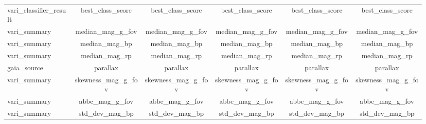 \documentclass[12pt,a4paper]{article}
\begin{document}
\begin{table}[h]
\begin{subtable}[h]{0.45\textwidth}
\begin{tabular}{lccccc}
\multicolumn{1}{l|}{vari\_classifier\_result } &         best\_class\_score                               &          best\_class\_score                 &          best\_class\_score                      &                                           best\_class\_score  &            best\_class\_score                   \\
\multicolumn{1}{l|}{vari\_summary}             &            median\_mag\_g\_fov                             &        median\_mag\_g\_fov                 &         median\_mag\_g\_fov                     &                    median\_mag\_g\_fov                       &         median\_mag\_g\_fov                    \\
\multicolumn{1}{l|}{vari\_summary}             &    median\_mag\_bp                                   &     median\_mag\_bp                       &         median\_mag\_bp                        &                                           median\_mag\_bp   &           median\_mag\_bp                     \\
\multicolumn{1}{l|}{vari\_summary }            &          median\_mag\_rp                           &          median\_mag\_rp              &         median\_mag\_rp                    &                                         median\_mag\_rp &          median\_mag\_rp                  \\
\multicolumn{1}{l|}{gaia\_source}              &     parallax                                 &    parallax                    &        parallax                     &            parallax                              &                           parallax \\
\multicolumn{1}{l|}{vari\_summary }            &        skewness\_mag\_g\_fov                               &     skewness\_mag\_g\_fov                     &         skewness\_mag\_g\_fov                      &                skewness\_mag\_g\_fov                            &          skewness\_mag\_g\_fov                    \\
\multicolumn{1}{l|}{vari\_summary}             &       abbe\_mag\_g\_fov                                &       abbe\_mag\_g\_fov                   &      abbe\_mag\_g\_fov                         &                                          abbe\_mag\_g\_fov  &           abbe\_mag\_g\_fov                   \\
\multicolumn{1}{l|}{vari\_summary }            &     std\_dev\_mag\_bp                                  &           std\_dev\_mag\_bp                     &        std\_dev\_mag\_bp                             &            std\_dev\_mag\_bp                                      &      std\_dev\_mag\_bp                              \\

\end{tabular}
\end{subtable}
\end{table}
\end{document}
